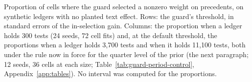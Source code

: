\begin{table}[t]\centering\scriptsize
\caption{Proportion of cells where the guard selected a nonzero weight on precedents, on synthetic ledgers with no planted text effect. Rows: the guard's threshold, in standard errors of the in-selection gain. Columns: the proportion when a ledger holds 300 tests (24 seeds, 72 cell fits) and, at the default threshold, the proportions when a ledger holds 3,700 tests and when it holds 11,100 tests, both under the rule now in force for the quarter level of the prior (the next paragraph; 12 seeds, 36 cells at each size; Table~\ref{tab:guard-period-control}, Appendix~\ref{app:tables}). No interval was computed for the proportions.}
\label{tab:fmt-guard-threshold}

\end{table}

